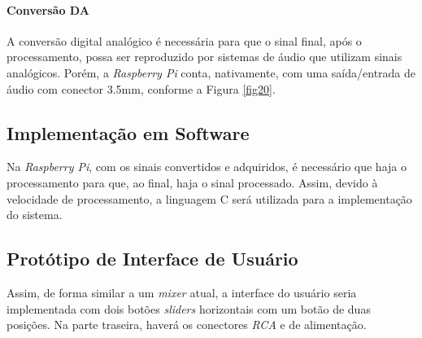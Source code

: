 \paragraph{Conversão DA}

A conversão digital analógico é necessária para que o sinal final, após o processamento, possa ser reproduzido por sistemas de áudio que utilizam sinais analógicos. Porém, a \textit{Raspberry Pi} conta, nativamente, com uma saída/entrada de áudio com conector 3.5mm, conforme a Figura \ref{fig20}.

\subsection{Implementação em Software}

Na \textit{Raspberry Pi}, com os sinais convertidos e adquiridos, é necessário que haja o processamento para que, ao final, haja o sinal processado. Assim, devido à velocidade de processamento, a linguagem C será utilizada para a implementação do sistema. 
    
\subsection{Protótipo de Interface de Usuário}

Assim, de forma similar a um \textit{mixer} atual, a interface do usuário seria implementada com dois botões \textit{sliders} horizontais com um botão de duas posições. Na parte traseira, haverá os conectores \textit{RCA} e de alimentação.
